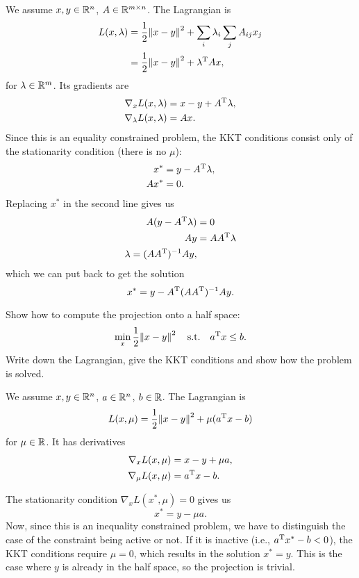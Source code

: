 \documentclass{article}
\begin{document}
We assume \(x, y \in \mathbb{R}^n\), \(A \in \mathbb{R}^{m \times n}\). The Lagrangian is
\begin{align*}
  L(x, \lambda) &= \frac{1}{2} \enVert{x - y}^2 + \sum_i \lambda_i \sum_j A_{ij} x_j \\
                &= \frac{1}{2} \enVert{x - y}^2 + \T{\lambda} A x,
\end{align*}
for \(\lambda \in \mathbb{R}^m\). Its gradients are
\begin{align*}
  \nabla_x L(x, \lambda) &= x - y + A^{\mathrm{T}} \lambda, \\
  \nabla_\lambda L(x, \lambda) &= A x.
\end{align*}
Since this is an equality constrained problem, the KKT conditions consist only of the stationarity
condition (there is no \(\mu\)):
\begin{align*}
  x^* &= y - A^{\mathrm{T}} \lambda, \\
  A x^* &= 0.
\end{align*}
Replacing \(x^*\) in the second line gives us
\begin{align*}
  A(y - A^{\mathrm{T}} \lambda) &= 0 \\
  Ay &= A A^{\mathrm{T}} \lambda \\
  \lambda = (A A^{\mathrm{T}})^{-1} A y,
\end{align*}
which we can put back to get the solution
\begin{equation*}
  x^* = y - A^{\mathrm{T}} (A A^{\mathrm{T}})^{-1} A y.
\end{equation*}


\begin{question}
  Show how to compute the projection onto a half space:
  \[
    \min_x \frac{1}{2} \enVert{x-y}^2 \quad \text{s.t.} \quad \T{a}x \leq b.
  \]
  Write down the Lagrangian, give the KKT conditions and show how the
  problem is solved.
\end{question}

We assume \(x, y \in \mathbb{R}^n\), \(a \in \mathbb{R}^n\), \(b \in \mathbb{R}\).  The Lagrangian is
\begin{equation*}
  L(x, \mu) = \frac{1}{2} \enVert{x-y}^2 + \mu(\T{a}x - b)
\end{equation*}
for \(\mu \in \mathbb{R}\).  It has derivatives
\begin{align*}
  \nabla_x L(x, \mu) &= x - y + \mu a, \\
  \nabla_\mu L(x, \mu) &= a^{\mathrm{T}} x - b.
\end{align*}

The stationarity condition \(\nabla_x L(x^*, \mu) = 0\) gives us
\begin{equation*}
  x^* = y - \mu a.
\end{equation*}
Now, since this is an inequality constrained problem, we have to distinguish the case of the
constraint being active or not.  If it is inactive (i.e., \(a^{\mathrm{T}}x^* - b < 0\)), the KKT conditions
require \(\mu = 0\), which results in the solution \(x^* = y\).  This is the case where \(y\) is
already in the half space, so the projection is trivial.
\end{document}
